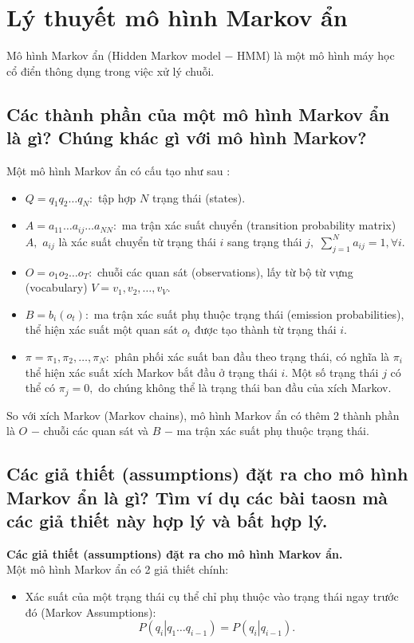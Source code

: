 \section{Lý thuyết mô hình Markov ẩn}
Mô hình Markov ẩn (Hidden Markov model $-$ HMM) là một mô hình máy học cổ điển thông dụng trong việc xử lý chuỗi.
\subsection{Các thành phần của một mô hình Markov ẩn là gì? Chúng khác gì với mô hình Markov?}
Một mô hình Markov ẩn có cấu tạo như sau \supercite{angrybird, hmm2021}:
\begin{mybox}
\begin{itemize}
\item $Q = {q_1}{q_2} \ldots {q_N}:$ tập hợp $N$ trạng thái (states).
\item $A = {a_{11}} \ldots {a_{ij}} \ldots {a_{NN}}:$ ma trận xác suất chuyển (transition probability matrix) $A,$ $a_{ij}$ là xác suất chuyển từ trạng thái $i$ sang trạng thái $j,$ $\sum\limits_{j = 1}^N {{a_{ij}}}  = 1,\forall i.$
\item $O = {o_1}{o_2} \ldots {o_T}:$ chuỗi các quan sát (observations), lấy từ bộ từ vựng (vocabulary) $V = {v_1}, {v_2}, \ldots, {v_V}.$
\item $B = b_i \left( {o_t} \right):$ ma trận xác suất phụ thuộc trạng thái (emission probabilities), thể hiện xác suất một quan sát $o_t$ được tạo thành từ trạng thái $i.$
\item $\pi = {\pi_1}, {\pi_2}, \ldots, {\pi_N}:$ phân phối xác suất ban đầu theo trạng thái, có nghĩa là $\pi_i$ thể hiện xác suất xích Markov bắt đầu ở trạng thái $i.$ Một số trạng thái $j$ có thể có $\pi_j = 0,$ do chúng không thể là trạng thái ban đầu của xích Markov.
\end{itemize}
\end{mybox}
So với xích Markov (Markov chains), mô hình Markov ẩn có thêm 2 thành phần là $O$ $-$ chuỗi các quan sát và $B$ $-$ ma trận xác suất phụ thuộc trạng thái.

\subsection{Các giả thiết (assumptions) đặt ra cho mô hình Markov ẩn là gì? Tìm ví dụ các bài taosn mà các giả thiết này hợp lý và bất hợp lý.}
\textbf{Các giả thiết (assumptions) đặt ra cho mô hình Markov ẩn.}\\
Một mô hình Markov ẩn có 2 giả thiết chính:
\begin{itemize}
\item Xác suất của một trạng thái cụ thể chỉ phụ thuộc vào trạng thái ngay trước đó (Markov Assumptions):
\begin{equation}
P\left( {\left. {{q_i}} \right|{q_1} \ldots {q_{i - 1}}} \right) = P\left( {\left. {{q_i}} \right|{q_{i - 1}}} \right).
\end{equation}

\end{itemize}